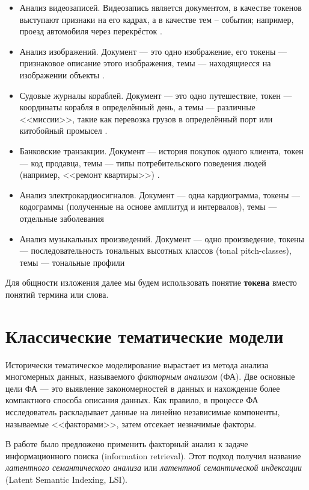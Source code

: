 \begin{itemize}
    \item Анализ видеозаписей. Видеозапись является документом, в качестве токенов выступают признаки на его кадрах, а в качестве тем – события; например, проезд автомобиля через перекрёсток \cite{sparse}.
    \item Анализ изображений. Документ --- это одно изображение, его токены --- признаковое описание этого изображения, темы --- находящиесся на изображении объекты \cite{mml1}.
    \item Судовые журналы кораблей. Документ --- это одно путешествие, токен --- координаты корабля в определённый день, а темы --- различные <<миссии>>, такие как перевозка грузов в определённый порт или китобойный промысел \cite{dh_sea}. 
    \item Банковские транзакции. Документ --- история покупок одного клиента, токен --- код продавца, темы --- типы потребительского поведения людей (например, <<ремонт квартиры>>) \cite{egorov2019topic}.
    \item Анализ электрокардиосигналов. Документ --- одна кардиограмма, токены --- кодограммы (полученные на основе амплитуд и интервалов), темы --- отдельные заболевания \cite{shapulin}
    \item Анализ музыкальных произведений. Документ --- одно произведение, токены --- последовательность тональных высотных классов (tonal pitch-classes), темы --- тональные профили \cite{moss2019transitions}
\end{itemize}

Для общности изложения далее мы будем использовать понятие \textbf{токена} вместо понятий термина или слова.

\section{Классические тематические модели}

Исторически тематическое моделирование вырастает из метода анализа многомерных данных, называемого \textit{факторным анализом} (ФА). Две основные цели ФА --- это выявление закономерностей в данных и нахождение более компактного способа описания данных. Как правило, в процессе ФА исследователь раскладывает данные на линейно независимые компоненты, называемые <<факторами>>, затем отсекает незначимые  факторы. 

В работе \cite{deerwester1990indexing} было предложено применить факторный анализ к задаче информационного поиска (information retrieval). Этот подход получил название \textit{латентного семантического анализа} или \textit{латентной семантической индексации} (Latent Semantic Indexing, LSI).

